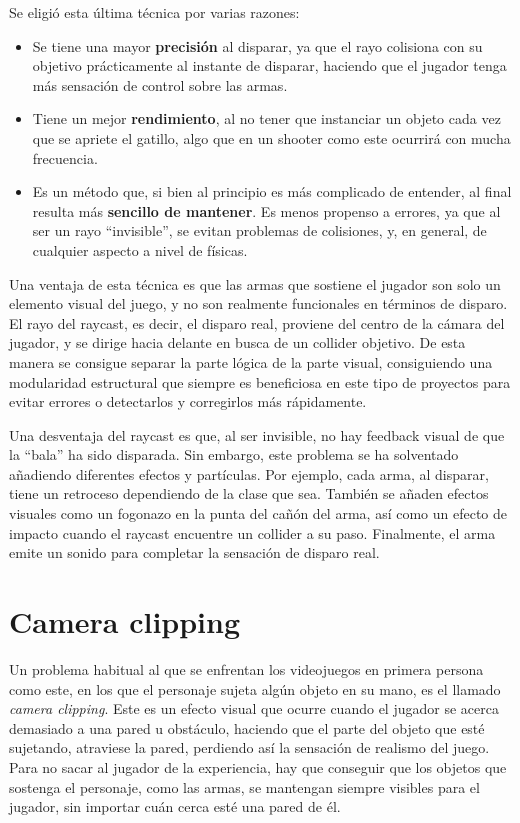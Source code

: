 Se eligió esta última técnica por varias razones:
\begin{itemize}
    \item Se tiene una mayor \textbf{precisión} al disparar, ya que el rayo colisiona con su objetivo prácticamente al instante de disparar, haciendo que el jugador tenga más sensación de control sobre las armas.
    \item Tiene un mejor  \textbf{rendimiento}, al no tener que instanciar un objeto cada vez que se apriete el gatillo, algo que en un shooter como este ocurrirá con mucha frecuencia.
    \item Es un método que, si bien al principio es más complicado de entender, al final resulta más  \textbf{sencillo de mantener}. Es menos propenso a errores, ya que al ser un rayo ``invisible'', se evitan problemas de colisiones, y, en general, de cualquier aspecto a nivel de físicas.
\end{itemize}

Una ventaja de esta técnica es que las armas que sostiene el jugador son solo un elemento visual del juego, y no son realmente funcionales en términos de disparo. El rayo del raycast,  es decir, el disparo real, proviene del centro de la cámara del jugador, y se dirige hacia delante en busca de un collider objetivo. De esta manera se consigue separar la parte lógica de la parte visual, consiguiendo una modularidad estructural que siempre es beneficiosa en este tipo de proyectos para evitar errores o detectarlos y corregirlos más rápidamente.

Una desventaja del raycast es que, al ser invisible, no hay feedback visual de que la ``bala'' ha sido disparada. Sin embargo, este problema se ha solventado añadiendo diferentes efectos y partículas. Por ejemplo, cada arma, al disparar, tiene un retroceso dependiendo de la clase que sea. También se añaden efectos visuales como un fogonazo en la punta del cañón del arma, así como un efecto de impacto cuando el raycast encuentre un collider a su paso. Finalmente, el arma emite un sonido para completar la sensación de disparo real.

\section{Camera clipping}
Un problema habitual al que se enfrentan los videojuegos en primera persona como este, en los que el personaje sujeta algún objeto en su mano, es el llamado \textit{camera clipping}. Este es un efecto visual que ocurre cuando el jugador se acerca demasiado a una pared u obstáculo, haciendo que el parte del objeto que esté sujetando, atraviese la pared, perdiendo así la sensación de realismo del juego. Para no sacar al jugador de la experiencia, hay que conseguir que los objetos que sostenga el personaje, como las armas, se mantengan siempre visibles para el jugador, sin importar cuán cerca esté una pared de él.

